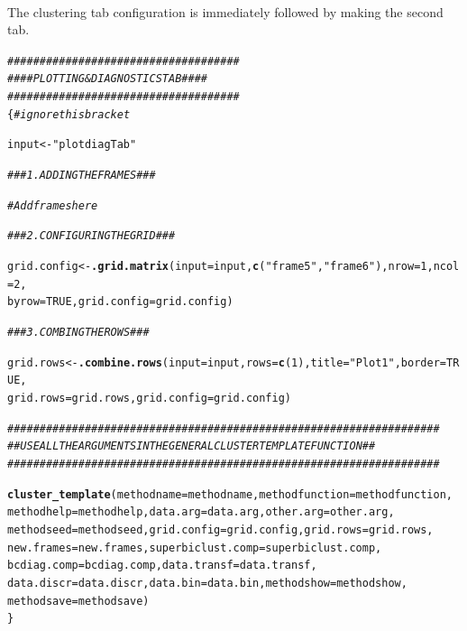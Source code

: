 \documentclass[a4paper]{article}\usepackage[]{graphicx}\usepackage[]{color}
\makeatletter
\newcommand{\hlnum}[1]{\textcolor[rgb]{0.686,0.059,0.569}{#1}}%
\newcommand{\hlstr}[1]{\textcolor[rgb]{0.192,0.494,0.8}{#1}}%
\newcommand{\hlcom}[1]{\textcolor[rgb]{0.678,0.584,0.686}{\textit{#1}}}%
\newcommand{\hlstd}[1]{\textcolor[rgb]{0.345,0.345,0.345}{#1}}%
\newcommand{\hlkwb}[1]{\textcolor[rgb]{0.69,0.353,0.396}{#1}}%
\newcommand{\hlkwc}[1]{\textcolor[rgb]{0.333,0.667,0.333}{#1}}%
\newcommand{\hlkwd}[1]{\textcolor[rgb]{0.737,0.353,0.396}{\textbf{#1}}}%
\newenvironment{kframe}{%
 \def\at@end@of@kframe{}%
 \ifinner\ifhmode%
  \def\at@end@of@kframe{\end{minipage}}%
  \begin{minipage}{\columnwidth}%
 \fi\fi%
 \def\FrameCommand##1{\hskip\@totalleftmargin \hskip-\fboxsep
 \colorbox{shadecolor}{##1}\hskip-\fboxsep
     \hskip-\linewidth \hskip-\@totalleftmargin \hskip\columnwidth}%
 \MakeFramed {\advance\hsize-\width
   \@totalleftmargin\z@ \linewidth\hsize
   \@setminipage}}%
 {\par\unskip\endMakeFramed%
 \at@end@of@kframe}
\newenvironment{knitrout}{}{} %
\makeatother
\begin{document}
\newpage
{}\\
\noindent The clustering tab configuration is immediately followed by making
the second tab.
\begin{knitrout}
\color{fgcolor}\begin{kframe}
\begin{alltt}
\hlcom{####################################}
\hlcom{#### PLOTTING & DIAGNOSTICS TAB ####}
\hlcom{####################################}
\hlstd{\{} \hlcom{# ignore this bracket}

\hlstd{input} \hlkwb{<-} \hlstr{"plotdiagTab"}

\hlcom{### 1. ADDING THE FRAMES ###}

\hlcom{# Add frames here}

\hlcom{### 2. CONFIGURING THE GRID ###}

\hlstd{grid.config} \hlkwb{<-} \hlkwd{.grid.matrix}\hlstd{(}\hlkwc{input}\hlstd{=input,}\hlkwd{c}\hlstd{(}\hlstr{"frame5"}\hlstd{,}\hlstr{"frame6"}\hlstd{),}\hlkwc{nrow}\hlstd{=}\hlnum{1}\hlstd{,}\hlkwc{ncol}\hlstd{=}\hlnum{2}\hlstd{,}
   \hlkwc{byrow}\hlstd{=}\hlnum{TRUE}\hlstd{,}\hlkwc{grid.config}\hlstd{=grid.config)}

\hlcom{### 3. COMBING THE ROWS ###}

\hlstd{grid.rows} \hlkwb{<-} \hlkwd{.combine.rows}\hlstd{(}\hlkwc{input}\hlstd{=input,}\hlkwc{rows}\hlstd{=}\hlkwd{c}\hlstd{(}\hlnum{1}\hlstd{),}\hlkwc{title}\hlstd{=}\hlstr{"Plot 1"}\hlstd{,}\hlkwc{border}\hlstd{=}\hlnum{TRUE}\hlstd{,}
   \hlkwc{grid.rows}\hlstd{=grid.rows,}\hlkwc{grid.config}\hlstd{=grid.config)}

\hlcom{###################################################################}
\hlcom{## USE ALL THE ARGUMENTS IN THE GENERAL CLUSTERTEMPLATE FUNCTION ##}
\hlcom{###################################################################}

\hlkwd{cluster_template}\hlstd{(}\hlkwc{methodname}\hlstd{=methodname,}\hlkwc{methodfunction}\hlstd{=methodfunction,}
   \hlkwc{methodhelp}\hlstd{=methodhelp,}\hlkwc{data.arg}\hlstd{=data.arg,}\hlkwc{other.arg}\hlstd{=other.arg,}
   \hlkwc{methodseed}\hlstd{=methodseed,}\hlkwc{grid.config}\hlstd{=grid.config,}\hlkwc{grid.rows}\hlstd{=grid.rows,}
   \hlkwc{new.frames}\hlstd{=new.frames,}\hlkwc{superbiclust.comp}\hlstd{=superbiclust.comp,}
   \hlkwc{bcdiag.comp}\hlstd{=bcdiag.comp,}\hlkwc{data.transf}\hlstd{=data.transf,}
   \hlkwc{data.discr}\hlstd{=data.discr,}\hlkwc{data.bin}\hlstd{=data.bin,}\hlkwc{methodshow}\hlstd{=methodshow,}
   \hlkwc{methodsave}\hlstd{=methodsave)}
\hlstd{\}}
\end{alltt}
\end{kframe}
\end{knitrout}
\end{document}
